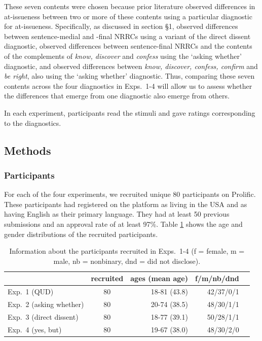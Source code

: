 \documentclass[times,linguex,xcolor]{glossa}
\begin{document}
  These seven contents were chosen because prior literature observed differences in at-issueness between two or more of these contents using a particular diagnostic for at-issueness.  Specifically, as discussed in section \S1, \citealt{syrett_experimental_2015} observed differences between sentence-medial and -final NRRCs using a variant of the direct dissent diagnostic, \citealt{tonhauser_how_2018} observed differences between sentence-final NRRCs and the contents of the complements of \emph{know, discover} and \emph{confess} using the `asking whether' diagnostic, and \citealt{degen-tonhauser-glossa} observed differences between \emph{know, discover, confess, confirm} and \emph{be right}, also using the `asking whether' diagnostic. Thus, comparing these seven contents across the four diagnostics in Exps.~1-4 will allow us to assess whether the differences that emerge from one diagnostic also emerge from others. 

  In each experiment, participants read the stimuli and gave ratings corresponding to the diagnostics.

  \subsection{Methods}
    
  \subsubsection{Participants}

  For each of the four experiments, we recruited unique 80 participants on Prolific. These participants had registered on the platform as living in the USA and as having English as their primary language. They had at least 50 previous submissions and an approval rate of at least 97\%.  Table \ref{t:recruited} shows the age and gender distributions of the recruited participants.

  \begin{table}[h!]
  \centering
  \begin{tabular}{l | c | r r r }
              & recruited & ages (mean age) & f/m/nb/dnd \\ \hline
  Exp.~1 (QUD) & 80 & 18-81 (43.8) & 42/37/0/1  \\
  Exp.~2 (asking whether) & 80 & 20-74 (38.5)  & 48/30/1/1  \\
  Exp.~3 (direct dissent) & 80 & 18-77 (39.1) & 50/28/1/1  \\
  Exp.~4 (yes, but) &80 & 19-67 (38.0)  & 48/30/2/0 &  \\
  \hline
  \end{tabular}

  \caption{Information about the participants recruited in Exps.~1-4 (f = female, m = male, nb = nonbinary, dnd = did not disclose).}\label{t:recruited}
  \end{table}
\end{document}
